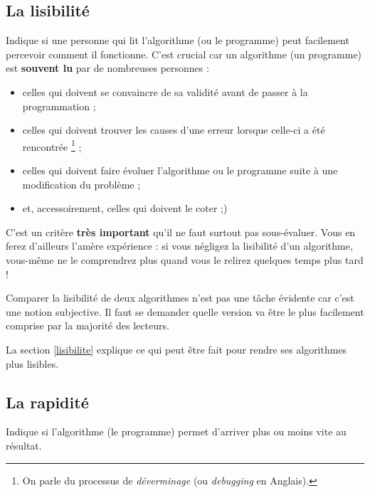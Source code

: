 		\subsection{La lisibilité}
		
			Indique si une personne qui lit l'algorithme
			(ou le programme)
			peut facilement percevoir comment il fonctionne.
			C'est crucial car un algorithme (un programme) 
			est \textbf{souvent lu} par de nombreuses personnes :
			\begin{itemize}
			\item
				celles qui doivent se convaincre de sa validité
				avant de passer à la programmation ;
			\item
				celles qui doivent trouver les causes
				d'une erreur lorsque celle-ci a été rencontrée%
				\footnote{%
					On parle du processus de \emph{déverminage}
					(ou \emph{debugging} en Anglais).%
				} ;
			\item
				celles qui doivent faire évoluer l'algorithme
				ou le programme suite à une modification
				du problème ;
			\item
				et, accessoirement, celles qui doivent le coter ;)
			\end{itemize}
			
			C'est un critère \textbf{très important}
			qu'il ne faut surtout pas sous-évaluer.
			Vous en ferez d'ailleurs l'amère expérience :
			si vous négligez la lisibilité d'un algorithme,
			vous-même ne le comprendrez plus quand vous le relirez
			quelques temps plus tard !
			
			Comparer la lisibilité de deux algorithmes
			n'est pas une tâche évidente car c'est une notion subjective.
			Il faut se demander quelle version va être le plus facilement
			comprise par la majorité des lecteurs.
			
			La section \vref{lisibilite}
			explique ce qui peut être fait pour rendre ses algorithmes
			plus lisibles.
				
		\subsection{La rapidité}
	    
			Indique si l'algorithme (le programme)
			permet d'arriver plus ou moins vite au résultat.
			
